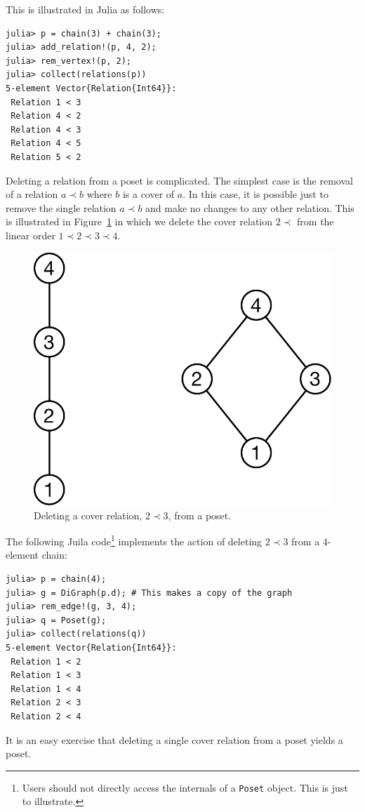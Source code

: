\documentclass[12pt]{article}
\begin{document}
This is illustrated in Julia as follows:
\begin{verbatim}
julia> p = chain(3) + chain(3);
julia> add_relation!(p, 4, 2);
julia> rem_vertex!(p, 2);
julia> collect(relations(p))
5-element Vector{Relation{Int64}}:
 Relation 1 < 3
 Relation 4 < 2
 Relation 4 < 3
 Relation 4 < 5
 Relation 5 < 2
\end{verbatim}

\newpage
{}

Deleting a relation from a poset is complicated. The simplest case is
the removal of a relation $a \prec b$ where $b$ is a cover of $a$. In
this case, it is possible just to remove the single relation $a \prec
b$ and make no changes to any other relation. This is illustrated in
Figure~\ref{fig:cover-edge-deletion} in which we delete the cover
relation $2\prec$ from the linear order $1\prec2\prec3\prec4$. 
\begin{figure}[h]
  \begin{framed}
    \begin{center}
      \includegraphics[scale=0.4]{cover-edge-deletion}
    \end{center}
    \caption{Deleting a cover relation, $2\prec3$, from a poset.}
    \label{fig:cover-edge-deletion}
  \end{framed}
\end{figure}

The following Juila code\footnote{Users should not directly access
  the internals of a \texttt{Poset} object. This is just to illustrate.}
implements the action of deleting $2 \prec 3$ from a 4-element chain:
\begin{verbatim}
julia> p = chain(4);
julia> g = DiGraph(p.d); # This makes a copy of the graph
julia> rem_edge!(g, 3, 4);
julia> q = Poset(g);
julia> collect(relations(q))
5-element Vector{Relation{Int64}}:
 Relation 1 < 2
 Relation 1 < 3
 Relation 1 < 4
 Relation 2 < 3
 Relation 2 < 4
\end{verbatim}
It is an easy exercise that deleting a single cover relation from a
poset yields a poset. 
\end{document}
